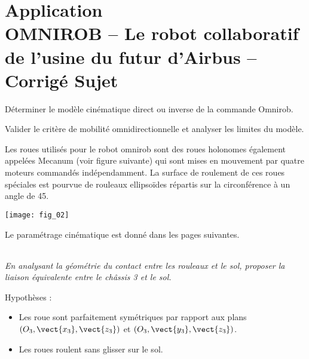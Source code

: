\chapter*{Application  \\ 
OMNIROB -- Le robot collaboratif de l'usine du futur d'Airbus -- \ifprof Corrigé \else Sujet \fi}

\iflivret {} \else
\ifprof  {} \else \fi
\fi

\setcounter{question}{0}

\marginnote[1cm]{
}


\begin{obj}
Déterminer le modèle cinématique direct ou inverse de la commande Omnirob. 

Valider le critère de mobilité omnidirectionnelle et analyser les limites du modèle.
\end{obj}


Les roues utilisés pour le robot omnirob sont des roues holonomes  également appelées Mecanum (voir figure suivante) qui sont mises en mouvement par quatre moteurs commandés indépendamment. La surface de roulement de ces roues spéciales est pourvue de rouleaux ellipsoïdes répartis sur la circonférence à un angle de 45\degres. 



\begin{marginfigure}
\texttt{[image: fig\_02]}
\end{marginfigure}


Le paramétrage cinématique est donné dans les pages suivantes. 

\subparagraph{}
\textit{En analysant la géométrie du contact entre les rouleaux et le sol, proposer la liaison équivalente entre le châssis 3 et le sol.}
\ifprof%
\begin{corrige}
\end{corrige}\else\fi

Hypothèses : 
\begin{itemize}
\item Les roue sont parfaitement symétriques par rapport aux plans $\left(O_3,\vect{x_3},\vect{z_3}\right)$
et $\left(O_3,\vect{y_3},\vect{z_3}\right)$.
\item Les roues roulent sans glisser sur le sol.
\end{itemize}

